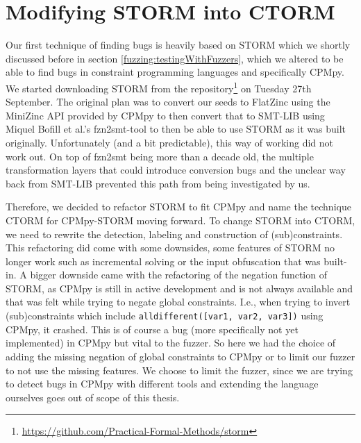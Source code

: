 \section{Modifying STORM into CTORM}
\label{impl:modifyingSTROM}
Our first technique of finding bugs is heavily based on STORM which we shortly discussed before in section \ref{fuzzing:testingWithFuzzers}, which we altered to be able to find bugs in constraint programming languages and specifically CPMpy. We started downloading STORM from the repository\footnote{\url{https://github.com/Practical-Formal-Methods/storm}} on Tuesday 27th September.
The original plan was to convert our seeds to FlatZinc using the MiniZinc API provided by CPMpy to then convert that to SMT-LIB \cite{72bofill2010system} using Miquel Bofill et al.'s fzn2smt-tool to then be able to use STORM as it was built originally. Unfortunately (and a bit predictable), this way of working did not work out. On top of fzn2smt being more than a decade old, the multiple transformation layers that could introduce conversion bugs and the unclear way back from SMT-LIB prevented this path from being investigated by us.

Therefore, we decided to refactor STORM to fit CPMpy and name the technique CTORM for CPMpy-STORM moving forward. To change STORM into CTORM, we need to rewrite the detection, labeling and construction of (sub)constraints. This refactoring did come with some downsides, some features of STORM no longer work such as incremental solving or the input obfuscation that was built-in. A bigger downside came with the refactoring of the negation function of STORM, as CPMpy is still in active development and is not always available and that was felt while trying to negate global constraints. I.e., when trying to invert (sub)constraints which include \texttt{alldifferent([var1, var2, var3])} using CPMpy, it crashed. This is of course a bug (more specifically not yet implemented) in CPMpy but vital to the fuzzer. So here we had the choice of adding the missing negation of global constraints to CPMpy or to limit our fuzzer to not use the missing features. We choose to limit the fuzzer, since we are trying to detect bugs in CPMpy with different tools and extending the language ourselves goes out of scope of this thesis. 



